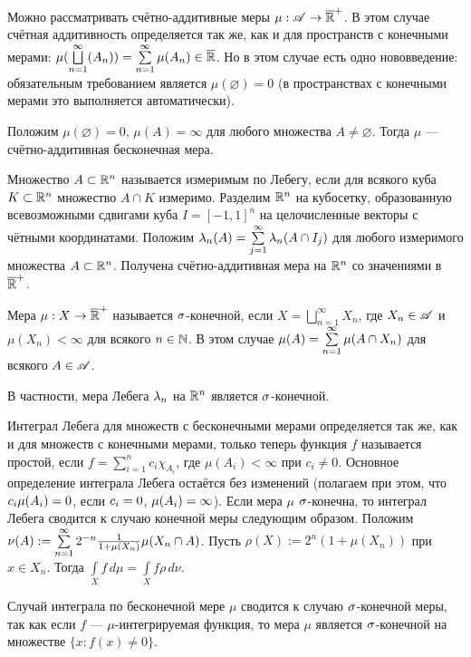 \documentclass[10pt]{article}
\begin{document}
Можно рассматривать счётно-аддитивные меры
$\mu:\mathscr{A}\rightarrow\overline{\mathbb{R}}^+$. В этом случае счётная аддитивность
определяется так же, как и для пространств с конечными мерами:
$\mu(\bigsqcup\limits_{n=1}^\infty(A_n))\bw
=\sumnui\mu(A_n)\in\overline\R$. Но в этом случае есть одно
нововведение: обязательным требованием является $\mu(\varnothing)=0$
(в пространствах с конечными мерами это выполняется автоматически).

\begin{ex}
Положим $\mu(\varnothing)=0$, $\mu(A)=\infty$ для любого множества
$A\ne\varnothing$. Тогда $\mu$ --- счётно-аддитивная бесконечная
мера.
\end{ex}

\begin{ex}
Множество $A\subset\mathbb{R}^n$ называется измеримым по Лебегу, если для
всякого куба $K\subset \mathbb{R}^n$ множество $A\cap K$ измеримо. Разделим
$\mathbb{R}^n$ на кубосетку, образованную всевозможными сдвигами куба
$I=[-1,1]^n$ на целочисленные векторы с чётными координатами.
Положим $\la_n(A)\bw =\sum\limits_{j=1}^\infty \la_n(A\cap I_j)$ для
любого измеримого множества $A\subset\mathbb{R}^n$. Получена
счётно-аддитивная мера на $\mathbb{R}^n$ со значениями в $\overline{\mathbb{R}}^+$.
\end{ex}

\begin{df}
Мера $\mu: X\rightarrow\overline{\mathbb{R}}^+$ называется $\sigma$-конечной, если
$X=\bigsqcup\limits_{n=1}^\infty X_n$, где $X_n\in\mathscr{A}$ и
$\mu(X_n)<\infty$ для всякого $n\in\mathbb{N}$. В этом случае $\mu(A)\bw
=\sumnui\mu(A\cap X_n)$ для всякого $A\in\mathscr{A}$.
\end{df}
В частности, мера Лебега $\lambda_n$ на $\mathbb{R}^n$ является $\sigma$-конечной.

Интеграл Лебега для множеств с бесконечными мерами определяется так
же, как и для множеств с конечными мерами, только теперь функция $f$
называется простой, если $f=\sum\limits_{i=1}^nc_i\chi_{A_i}$, где
$\mu(A_i)<\infty$ при $c_i\ne 0$. Основное определение интеграла
Лебега остаётся без изменений (полагаем при этом, что
$c_i\mu(A_i)\bw =0$, если $c_i\bw =0$, $\mu(A_i)\bw =\infty$). Если
мера $\mu$ $\sigma$-конечна, то интеграл Лебега сводится к случаю
конечной меры следующим образом. Положим
$\nu(A):=\sum\limits_{n=1}^{\infty}2^{-n}\frac1{1+\mu(X_n)}\mu(X_n\cap A)$. Пусть
$\rho(X):=2^n(1+\mu(X_n))$ при $x\in X_n$. Тогда
$\int\limits_Xf\,d\mu=\int\limits_Xf\rho\,d\nu$.

\begin{problem}
Случай интеграла по бесконечной мере $\mu$ сводится к случаю
$\sigma$-конечной меры, так как если $f$ --- $\mu$-интегрируемая
функция, то мера $\mu$ является $\sigma$-конечной на множестве
$\{x:f(x)\ne 0\}$.
\end{problem}
\end{document}
